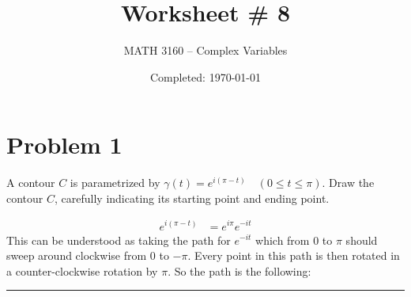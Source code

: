 \documentclass{article}
\title{Worksheet \# 8}
\author{
  MATH 3160 -- Complex Variables\\
  \myauthor
}
\date{Completed: \today}
\begin{document}
\maketitle %


\section*{Problem 1}
A contour $C$ is parametrized by $\gamma(t) = e^{i(\pi - t)} \quad (0 \leq t \leq \pi)$. Draw the contour $C$, carefully indicating its starting point and ending point. 

\begin{align*}
  e^{i(\pi-t)} &= e^{i\pi}e^{-it}
\end{align*}
This can be understood as taking the path for $e^{-it}$ which from $0$ to $\pi$ should sweep around clockwise from 0 to $-\pi$. Every point in this path is then rotated in a counter-clockwise rotation by $\pi$. So the path is the following: 

\vspace{1cm} %
\begin{center}
\end{center}
\vspace{1cm}
\hrule %
\end{document}
